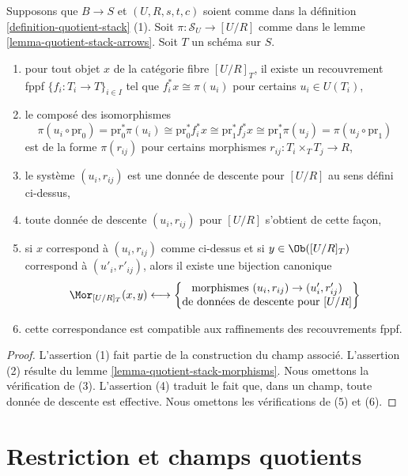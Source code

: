 \begin{lemma}
\label{lemma-quotient-stack-objects}
Supposons que $B \to S$ et $(U, R, s, t, c)$ soient comme dans la définition \ref{definition-quotient-stack} (1). Soit $\pi : \mathcal{S}_U \to [U/R]$ comme dans le lemme \ref{lemma-quotient-stack-arrows}. Soit $T$ un schéma sur $S$.
\begin{enumerate}
\item pour tout objet $x$ de la catégorie fibre $[U/R]_T$, il existe un recouvrement fppf $\{f_i : T_i \to T\}_{i \in I}$ tel que $f_i^*x \cong \pi(u_i)$ pour certains $u_i \in U(T_i)$,
\item le composé des isomorphismes
$$
\pi(u_i \circ \text{pr}_0)
=
\text{pr}_0^*\pi(u_i)
\cong
\text{pr}_0^*f_i^*x
\cong
\text{pr}_1^*f_j^*x
\cong
\text{pr}_1^*\pi(u_j)
=
\pi(u_j \circ \text{pr}_1)
$$
est de la forme $\pi(r_{ij})$ pour certains morphismes $r_{ij} : T_i \times_T T_j \to R$,
\item le système $(u_i, r_{ij})$ est une donnée de descente pour $[U/R]$ au sens défini ci-dessus,
\item toute donnée de descente $(u_i, r_{ij})$ pour $[U/R]$ s'obtient de cette façon,
\item si $x$ correspond à $(u_i, r_{ij})$ comme ci-dessus et si $y \in \Ob([U/R]_T)$ correspond à $(u'_i, r'_{ij})$, alors il existe une bijection canonique
$$
\Mor_{[U/R]_T}(x, y)
\longleftrightarrow
\left\{
\begin{matrix}
\text{morphismes }(u_i, r_{ij}) \to (u'_i, r'_{ij})\\
\text{de données de descente pour }[U/R]\text{}
\end{matrix}
\right\}
$$
\item cette correspondance est compatible aux raffinements des recouvrements fppf.
\end{enumerate}
\end{lemma}

\begin{proof}
L'assertion (1) fait partie de la construction du champ associé. L'assertion (2) résulte du lemme \ref{lemma-quotient-stack-morphisms}. Nous omettons la vérification de (3). L'assertion (4) traduit le fait que, dans un champ, toute donnée de descente est effective. Nous omettons les vérifications de (5) et (6).
\end{proof}








\section{Restriction et champs quotients}
\label{section-quotient-stack-restrict}

